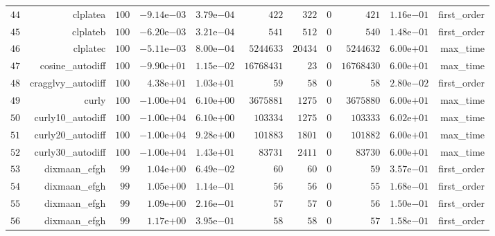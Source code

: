 \documentclass[varwidth=20cm,crop=true]{standalone}
\begin{document}
\begin{longtable}{rrrrrrrrrrr}
  \(    44\) & clplatea & \(   100\) & \(-9.14\)e\(-03\) & \( 3.79\)e\(-04\) & \(   422\) & \(   322\) & \(     0\) & \(   421\) & \( 1.16\)e\(-01\) & first\_order \\
  \(    45\) & clplateb & \(   100\) & \(-6.20\)e\(-03\) & \( 3.21\)e\(-04\) & \(   541\) & \(   512\) & \(     0\) & \(   540\) & \( 1.48\)e\(-01\) & first\_order \\
  \(    46\) & clplatec & \(   100\) & \(-5.11\)e\(-03\) & \( 8.00\)e\(-04\) & \(5244633\) & \( 20434\) & \(     0\) & \(5244632\) & \( 6.00\)e\(+01\) & max\_time \\
  \(    47\) & cosine\_autodiff & \(   100\) & \(-9.90\)e\(+01\) & \( 1.15\)e\(-02\) & \(16768431\) & \(    23\) & \(     0\) & \(16768430\) & \( 6.00\)e\(+01\) & max\_time \\
  \(    48\) & cragglvy\_autodiff & \(   100\) & \( 4.38\)e\(+01\) & \( 1.03\)e\(+01\) & \(    59\) & \(    58\) & \(     0\) & \(    58\) & \( 2.80\)e\(-02\) & first\_order \\
  \(    49\) & curly & \(   100\) & \(-1.00\)e\(+04\) & \( 6.10\)e\(+00\) & \(3675881\) & \(  1275\) & \(     0\) & \(3675880\) & \( 6.00\)e\(+01\) & max\_time \\
  \(    50\) & curly10\_autodiff & \(   100\) & \(-1.00\)e\(+04\) & \( 6.10\)e\(+00\) & \(103334\) & \(  1275\) & \(     0\) & \(103333\) & \( 6.02\)e\(+01\) & max\_time \\
  \(    51\) & curly20\_autodiff & \(   100\) & \(-1.00\)e\(+04\) & \( 9.28\)e\(+00\) & \(101883\) & \(  1801\) & \(     0\) & \(101882\) & \( 6.00\)e\(+01\) & max\_time \\
  \(    52\) & curly30\_autodiff & \(   100\) & \(-1.00\)e\(+04\) & \( 1.43\)e\(+01\) & \( 83731\) & \(  2411\) & \(     0\) & \( 83730\) & \( 6.00\)e\(+01\) & max\_time \\
  \(    53\) & dixmaan\_efgh & \(    99\) & \( 1.04\)e\(+00\) & \( 6.49\)e\(-02\) & \(    60\) & \(    60\) & \(     0\) & \(    59\) & \( 3.57\)e\(-01\) & first\_order \\
  \(    54\) & dixmaan\_efgh & \(    99\) & \( 1.05\)e\(+00\) & \( 1.14\)e\(-01\) & \(    56\) & \(    56\) & \(     0\) & \(    55\) & \( 1.68\)e\(-01\) & first\_order \\
  \(    55\) & dixmaan\_efgh & \(    99\) & \( 1.09\)e\(+00\) & \( 2.16\)e\(-01\) & \(    57\) & \(    57\) & \(     0\) & \(    56\) & \( 1.50\)e\(-01\) & first\_order \\
  \(    56\) & dixmaan\_efgh & \(    99\) & \( 1.17\)e\(+00\) & \( 3.95\)e\(-01\) & \(    58\) & \(    58\) & \(     0\) & \(    57\) & \( 1.58\)e\(-01\) & first\_order \\

\end{longtable}
\end{document}
